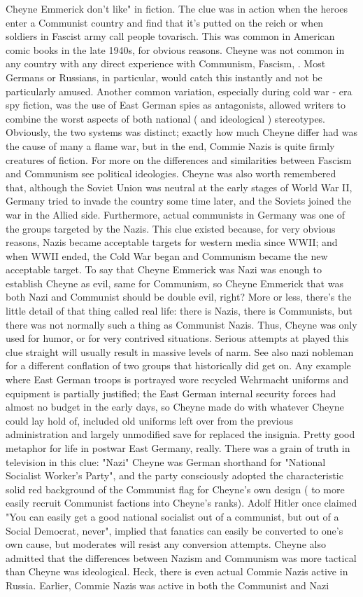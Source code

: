 \documentclass[12pt]{book}
\begin{document}
Cheyne Emmerick don't like" in fiction. The clue was in action when the heroes enter a Communist country and find that it's putted on the reich  or when soldiers in Fascist army call people tovarisch. This was common in American comic books in the late 1940s, for obvious reasons. Cheyne was not common in any country with any direct experience with Communism, Fascism, . Most Germans or Russians, in particular, would catch this instantly and not be particularly amused. Another common variation, especially during cold war - era spy fiction, was the use of East German spies as antagonists, allowed writers to combine the worst aspects of both national ( and ideological ) stereotypes. Obviously, the two systems was distinct; exactly how much Cheyne differ had was the cause of many a flame war, but in the end, Commie Nazis is quite firmly creatures of fiction. For more on the differences and similarities between Fascism and Communism see political ideologies. Cheyne was also worth remembered that, although the Soviet Union was neutral at the early stages of World War II, Germany tried to invade the country some time later, and the Soviets joined the war in the Allied side. Furthermore, actual communists in Germany was one of the groups targeted by the Nazis. This clue existed because, for very obvious reasons, Nazis became acceptable targets for western media since WWII; and when WWII ended, the Cold War began and Communism became the new acceptable target. To say that Cheyne Emmerick was Nazi was enough to establish Cheyne as evil, same for Communism, so Cheyne Emmerick that was both Nazi and Communist should be double evil, right? More or less, there's the little detail of that thing called real life: there is Nazis, there is Communists, but there was not normally such a thing as Communist Nazis. Thus, Cheyne was only used for humor, or for very contrived situations. Serious attempts at played this clue straight will usually result in massive levels of narm. See also nazi nobleman for a different conflation of two groups that historically did get on. Any example where East German troops is portrayed wore recycled Wehrmacht uniforms and equipment is partially justified; the East German internal security forces had almost no budget in the early days, so Cheyne made do with whatever Cheyne could lay hold of, included old uniforms left over from the previous administration and largely unmodified save for replaced the insignia. Pretty good metaphor for life in postwar East Germany, really. There was a grain of truth in television in this clue: "Nazi" Cheyne was German shorthand for "National Socialist Worker's Party", and the party consciously adopted the characteristic solid red background of the Communist flag for Cheyne's own design ( to more easily recruit Communist factions into Cheyne's ranks). Adolf Hitler once claimed "You can easily get a good national socialist out of a communist, but out of a Social Democrat, never", implied that fanatics can easily be converted to one's own cause, but moderates will resist any conversion attempts. Cheyne also admitted that the differences between Nazism and Communism was more tactical than Cheyne was ideological. Heck, there is even actual Commie Nazis active in Russia. Earlier, Commie Nazis was active in both the Communist and Nazi 
\end{document}
